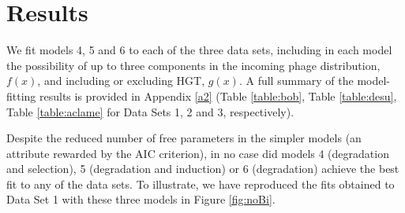 \section{Results}
\label{results}
We fit models 4, 5 and 6 to each of the three data sets, including in each model the possibility of up to three components in the incoming phage distribution, $f(x)$, and including or excluding HGT, $g(x)$.  
A full summary of the model-fitting results is provided in Appendix \ref{a2} (Table \ref{table:bob}, Table \ref{table:desu}, Table \ref{table:aclame} for Data Sets 1, 2 and 3, respectively).

Despite the reduced number of free parameters in the simpler models (an attribute rewarded by the AIC criterion), in no case did models 4 (degradation and selection), 5 (degradation and induction) or 6 (degradation) achieve the best fit to any of the data sets.  To illustrate, we have reproduced the fits obtained to Data Set 1 with these three models in Figure \ref{fig:noBi}.

